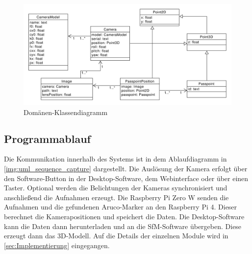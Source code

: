 \documentclass[./00PhotoBox.tex]{subfiles}
\begin{document}
\begin{figure}
  \centering
  \includegraphics[width=1\textwidth]{./img/uml/uml_domain.pdf}
  \caption{Domänen-Klassendiagramm} %
  \label{img:dokladia} %
\end{figure}

\subsection{Programmablauf}
Die Kommunikation innerhalb des Systems ist in dem Ablaufdiagramm in \autoref{img:uml_sequence_capture} dargestellt. Die Auslösung der Kamera erfolgt über den Software-Button in der Desktop-Software, dem Webinterface oder über einen Taster. Optional werden die Belichtungen der Kameras synchronisiert und anschließend die Aufnahmen erzeugt. Die Raspberry Pi Zero W senden die Aufnahmen und die gefundenen Aruco-Marker an den Raspberry Pi 4. Dieser berechnet die Kamerapositionen und speichert die Daten. Die Desktop-Software kann die Daten dann herunterladen und an die SfM-Software übergeben. Diese erzeugt dann das 3D-Modell. Auf die Details der einzelnen Module wird in \autoref{sec:Implementierung} eingegangen.
\end{document}
